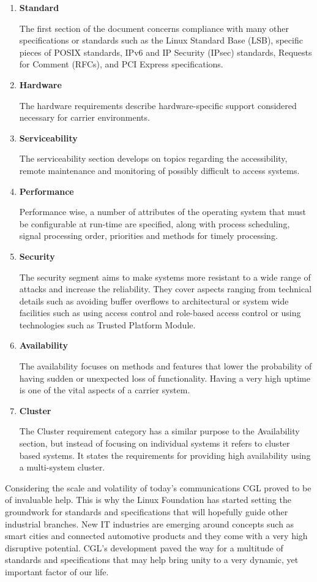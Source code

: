 \begin{enumerate}
\item \textbf{Standard}

The first section of the document concerns compliance with many other specifications or standards such as the Linux Standard Base (LSB), specific pieces of POSIX standards, IPv6 and IP Security (IPsec) standards, Requests for Comment (RFCs), and PCI Express specifications.
\item \textbf{Hardware}

The hardware requirements describe hardware-specific support considered necessary for carrier environments.
\item \textbf{Serviceability}

The serviceability section develops on topics regarding the accessibility, remote maintenance and monitoring of possibly difficult to access systems. 
\item \textbf{Performance}

Performance wise, a number of attributes of the operating system that must be configurable at run-time are specified, along with process scheduling, signal processing order, priorities and methods for timely processing.
\item \textbf{Security}

The security segment aims to make systems more resistant to a wide range of attacks and increase the reliability. They cover aspects ranging from technical details such as avoiding buffer overflows to architectural or system wide facilities such as using access control and role-based access control or using technologies such as Trusted Platform Module.
\item \textbf{Availability}

The availability focuses on methods and features that lower the probability of having sudden or unexpected loss of functionality. Having a very high uptime is one of the vital aspects of a carrier system.
\item \textbf{Cluster}

The Cluster requirement category has a similar purpose to the Availability section, but instead of focusing on individual systems it refers to cluster based systems. It states the requirements for providing high availability using a multi-system cluster.

\end{enumerate}

Considering the scale and volatility of today's communications CGL proved to be of invaluable help. This is why the Linux Foundation has started setting the groundwork for standards and specifications that will hopefully guide other industrial branches. New IT industries are emerging around concepts such as smart cities and connected automotive products and they come with a very high disruptive potential. CGL's development paved the way for a multitude of standards and specifications that may help bring unity to a very dynamic, yet important factor of our life.

